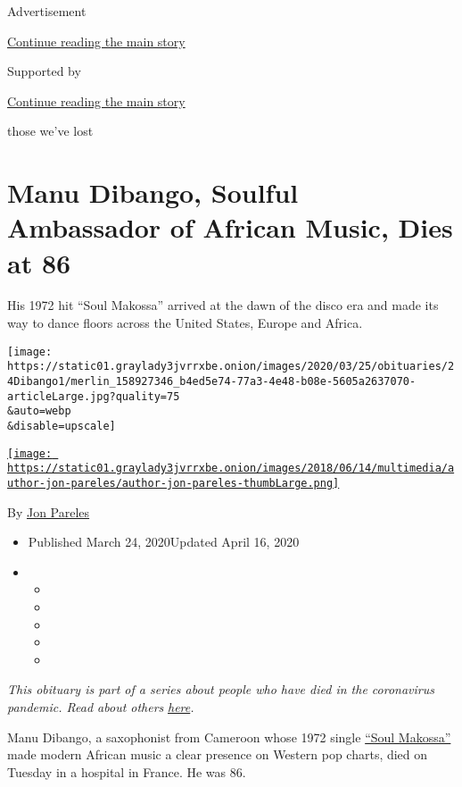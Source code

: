 Advertisement

\protect\hyperlink{after-top}{Continue reading the main story}

Supported by

\protect\hyperlink{after-sponsor}{Continue reading the main story}

those we've lost

\hypertarget{manu-dibango-soulful-ambassador-of-african-music-dies-at-86}{%
\section{Manu Dibango, Soulful Ambassador of African Music, Dies at
86}\label{manu-dibango-soulful-ambassador-of-african-music-dies-at-86}}

His 1972 hit ``Soul Makossa'' arrived at the dawn of the disco era and
made its way to dance floors across the United States, Europe and
Africa.

\texttt{[image: https://static01.graylady3jvrrxbe.onion/images/2020/03/25/obituaries/24Dibango1/merlin\_158927346\_b4ed5e74-77a3-4e48-b08e-5605a2637070-articleLarge.jpg?quality=75\\\&auto=webp\\\&disable=upscale]}

\href{https://www.nytimes3xbfgragh.onion/by/jon-pareles}{\texttt{[image: https://static01.graylady3jvrrxbe.onion/images/2018/06/14/multimedia/author-jon-pareles/author-jon-pareles-thumbLarge.png]}}

By \href{https://www.nytimes3xbfgragh.onion/by/jon-pareles}{Jon Pareles}

\begin{itemize}
\item
  Published March 24, 2020Updated April 16, 2020
\item
  \begin{itemize}
  \item
  \item
  \item
  \item
  \item
  \end{itemize}
\end{itemize}

\emph{This obituary is part of a series about people who have died in
the coronavirus pandemic. Read about others}
\href{https://www.nytimes3xbfgragh.onion/series/people-who-have-died-of-the-coronavirus}{\emph{here}}\emph{.}

Manu Dibango, a saxophonist from Cameroon whose 1972 single
\href{https://www.youtube.com/watch?v=EF92yOsv3Y8}{``Soul Makossa''}
made modern African music a clear presence on Western pop charts, died
on Tuesday in a hospital in France. He was 86.

